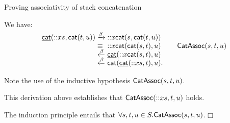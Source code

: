 %
\begin{frame}{Proving associativity of stack concatenation}

  We have:
  \begin{equation*}
    \begin{array}{r@{\;}l@{\;}l@{\qquad}r@{}}
      \ufun{cat}(\cons{x}{s},\fun{cat}(t,u))
      & \xrightarrow{\smash\beta}
      & \cons{x}{\fun{cat}(s,\fun{cat}(t,u))}\\
      & \equiv
      & \cons{x}{\fun{cat}(\fun{cat}(s,t),u)}
      & \IH{\pred{CatAssoc}{s,t,u}}\\
      & \xleftarrow{\smash\beta}
      & \ufun{cat}(\cons{x}{\fun{cat}(s,t)},u)\\
      & \xleftarrow{\smash\beta}
      & \fun{cat}(\ufun{cat}(\cons{x}{s},t),u).
    \end{array}
  \end{equation*}

  Note the use of the inductive hypothesis \(\textsf{CatAssoc}({s,t,u})\).

  \bigskip

  This derivation above establishes that
  \(\textsf{CatAssoc}({\textsf{::}{x}{s},t,u})\) holds.

  \bigskip

  The induction principle entails that \(\forall s,t,u \in
  S.\textsf{CatAssoc}({s,t,u})\).\hfill\(\Box\)

\end{frame}
